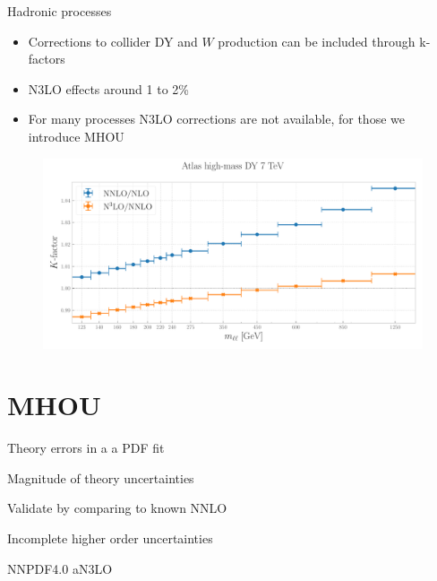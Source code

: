 \documentclass[aspectratio=169, 9pt,t]{beamer}
\begin{document}
\begin{frame}{Hadronic processes}
  \begin{itemize}
    \item Corrections to collider DY and $W$ production can be included through k-factors
    \item N3LO effects around 1 to 2\%
    \item For many processes N3LO corrections are not available, for those we introduce MHOU
  \end{itemize}
  \begin{figure}[!t]
    \centering
    \includegraphics[width=.80\textwidth]{figures/kfactor_ATLASZHIGHMASS49FB.pdf}
  \end{figure}
\end{frame}


\section{MHOU}

\begin{frame}{Theory errors in a a PDF fit}
\end{frame}

\begin{frame}{Magnitude of theory uncertainties}
\end{frame}

\begin{frame}{Validate by comparing to known NNLO}
\end{frame}


\begin{frame}{Incomplete higher order uncertainties}
%
\end{frame}


\begin{frame}{NNPDF4.0 aN3LO}
\end{frame}
\end{document}
